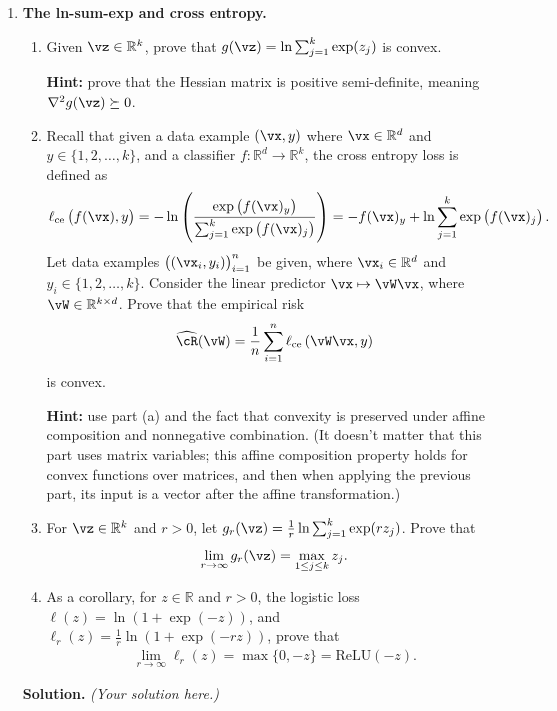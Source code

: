\documentclass{article}
\def\hcR{\widehat{\cR}}
\theoremstyle{definition}
\theoremstyle{remark}
\newenvironment{Q}
{%
\clearpage
\item
}
{%
\phantom{s}
\bigskip
\textbf{Solution.}
\emph{(Your solution here.)}
}
\begin{document}
\begin{enumerate}

\begin{Q}
    \textbf{The ln-sum-exp and cross entropy.}
    \begin{enumerate}
        \item Given $\vz\in \mathbb{R}^k$, prove that $g(\vz)=\ln \sum_{j=1}^{k}\exp(z_j)$ is convex.

        \textbf{Hint:} prove that the Hessian matrix is positive semi-definite, meaning $\nabla^2g(\vz)\succeq0$.

        \item Recall that given a data example $(\vx,y)$ where $\vx\in \mathbb{R}^d$ and $y\in\{1,2,\ldots,k\}$,
        and a classifier $f:\mathbb{R}^d\to \mathbb{R}^k$, the cross entropy loss is defined as
        \begin{align*}
            \ell_{\mathrm{ce}}\del{f(\vx),y}=-\ln\del{\frac{\exp\del{f(\vx)_y}}{\sum_{j=1}^{k}\exp\del{f(\vx)_j}}}=-f(\vx)_y+\ln\sum_{j=1}^{k}\exp\del{f(\vx)_j}.
        \end{align*}
        Let data examples $\del{\del{\vx_i,y_i}}_{i=1}^n$ be given, where $\vx_i\in \mathbb{R}^d$ and $y_i\in\{1,2,\ldots,k\}$. Consider the linear predictor $\vx\mapsto\vW\vx$, where $\vW\in \mathbb{R}^{k\times d}$.  Prove that the empirical risk
        \begin{align*}
            \hcR(\vW)=\frac{1}{n}\sum_{i=1}^{n}\ell_{\mathrm{ce}}\del{\vW\vx,y}
        \end{align*}
        is convex.

        \textbf{Hint:} use part (a) and the fact that convexity is preserved under affine composition and nonnegative combination.
        (It doesn't matter that this part uses matrix variables; this affine composition property holds for convex functions
        over matrices, and then when applying the previous part, its input is a vector after the affine transformation.)

        \item For $\vz\in \mathbb{R}^k$ and $r>0$, let $g_r(\vz)=\frac{1}{r}\ln \sum_{j=1}^{k}\exp(rz_j)$. Prove that
        \begin{align*}
            \lim_{r\to\infty}g_r(\vz)=\max_{1\le j\le k}z_j.
        \end{align*}

      \item
        As a corollary, for $z\in \mathbb{R}$ and $r>0$, the logistic loss $\ell(z)=\ln(1+\exp(-z))$, and $\ell_r(z)=\frac{1}{r}\ln(1+\exp(-rz))$, prove that
        \begin{align*}
            \lim_{r\to\infty}\ell_r(z)=\max\{0,-z\}=\mathrm{ReLU}(-z).
        \end{align*}
    \end{enumerate}
\end{Q}


\end{enumerate}
\end{document}
